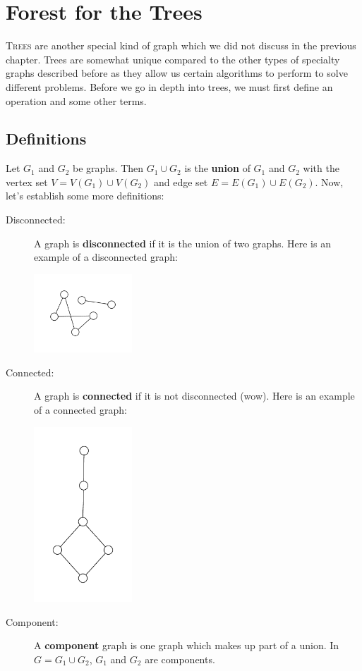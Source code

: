 \chapter{Forest for the Trees}
\lettrine[lines=4]{T}{rees} are another special kind of graph which we did not discuss in the previous chapter. Trees are somewhat unique compared to the other types of specialty graphs described before as they allow us certain algorithms to perform to solve different problems. Before we go in depth into trees, we must first define an operation and some other terms.

\section{Definitions}
Let $G_1$ and $G_2$ be graphs. Then $G_1 \cup G_2$ is the \textbf{union} of $G_1$ and $G_2$ with the vertex set $V = V(G_1) \cup V(G_2)$ and edge set $E = E(G_1) \cup E(G_2)$. Now, let's establish some more definitions:
\begin{description}
    \item[Disconnected:] A graph is \textbf{disconnected} if it is the union of two graphs. Here is an example of a disconnected graph:
    \begin{center}
        \includegraphics[width=0.3\textwidth]{Chapter2/disconnect.pdf}
    \end{center}
    \item[Connected:] A graph is \textbf{connected} if it is not disconnected (wow). Here is an example of a connected graph:
    \begin{center}
        \includegraphics[width=0.3\textwidth]{Chapter2/connect.pdf}
    \end{center}
    \item[Component:] A \textbf{component} graph is one graph which makes up part of a union. In $G = G_1 \cup G_2$, $G_1$ and $G_2$ are components.
\end{description}

